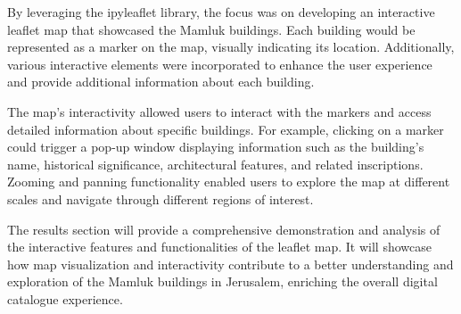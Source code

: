 By leveraging the ipyleaflet library, the focus was on developing an interactive leaflet map that showcased the Mamluk buildings. Each building would be represented as a marker on the map, visually indicating its location. Additionally, various interactive elements were incorporated to enhance the user experience and provide additional information about each building.

The map's interactivity allowed users to interact with the markers and access detailed information about specific buildings. For example, clicking on a marker could trigger a pop-up window displaying information such as the building's name, historical significance, architectural features, and related inscriptions. Zooming and panning functionality enabled users to explore the map at different scales and navigate through different regions of interest.

The results section will provide a comprehensive demonstration and analysis of the interactive features and functionalities of the leaflet map. It will showcase how map visualization and interactivity contribute to a better understanding and exploration of the Mamluk buildings in Jerusalem, enriching the overall digital catalogue experience.

